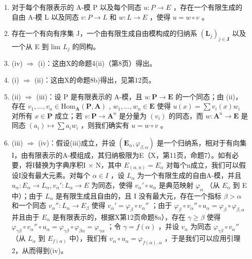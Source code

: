 \begin{enumerate}
\def\labelenumi{(\roman{enumi})}
\setcounter{enumi}{2}
\item
  对于每个有限表示的 A-模 P 以及每个同态 \(u : P \to E\) ，存在一个有限生成的自由 A-模 L 以及同态 \(v : P \to L\) 和 \(w : L \to E\) ，使得 \(u = w \circ v\) 。
\item
  存在一个有向有序集 J，一个由有限生成自由模构成的归纳系 \((\mathbf{L}_{j})_{j\in\mathbf{J}}\) 以及一个从 E 到 lim \(L_{j}\) 的同构。
\item
  (iv) \(\Rightarrow\) (i)：这由X的命题4(ii)（第8页）得出。
\item
  (i) \(\Rightarrow\) (ii)：这由X的命题8b)得出，见第12页。
\item
  (ii) \(\Rightarrow\) (iii)：设 P 是有限表示的 A-模，且 \(u: \mathbf{P} \to \mathbf{E}\) 的一个同态；由 (ii)，存在 \(v_1, \ldots, v_n \in \mathrm{Hom}_{\mathbf{A}}(\mathbf{P}, \mathbf{A})\) , \(w_1, \ldots, w_n \in \mathbf{E}\) 使得 \(u(x) = \sum v_i(x) w_i\) 对所有 \(x \in \mathbf{P}\) 成立；若 \(v: \mathbf{P} \to \mathbf{A}^n\) 是分量为 \((v_i)\) 的同态，而 \(w: \mathbf{A}^n \to \mathbf{E}\) 是同态 \((a_i) \mapsto \sum a_i w_i\) ，则我们确实有 \(u = w \circ v\) 。
\item
  (iii) \(\Rightarrow\) (iv)：假设(iii)成立，并设 \((\mathbf{E}_{\alpha},\varphi_{\beta ,\alpha})\) 是一个归纳系，相对于有向集I，由有限表示的A-模组成，其归纳极限为E（X，第11页，命题7）。如有必要，将I替换为字典序积I × N，其中 \(E_{(\alpha,n)} = E_{\alpha}\) 对每个n成立，我们可以假设I没有最大元素。对每个 \(\alpha \in I\) ，设 \(L_{\alpha}\) 为一个有限生成的自由A-模，并且 \(u_{\alpha}: E_{\alpha} \to L_{\alpha}, v_{\alpha}': L_{\alpha} \to E\) 为同态，使得 \(v_{\alpha}' \circ u_{\alpha}\) 是典范映射 \(\varphi_{\alpha}\) （从 \(E_{\alpha}\) 到 E 中）；由于 \(L_{\alpha}\) 是有限生成且自由的，且 I 没有最大元，存在一个指标 \(\beta > \alpha\) 和一个同态 \(v_{\alpha}'': L_{\alpha} \to E_{\beta}\) 使得 \(v_{\alpha}' = \varphi_{\beta} \circ v_{\alpha}''\) ；由于 \(\varphi_{\beta} \circ v_{\alpha}'' \circ u_{\alpha} = \varphi_{\beta} \circ \varphi_{\beta,\alpha}\) 并且由于 \(E_{\alpha}\) 是有限表示的，根据X第12页命题8a），存在 \(\gamma \geqslant \beta\) 使得 \(\varphi_{\gamma\beta} \circ v_{\alpha}'' \circ u_{\alpha} = \varphi_{\gamma\beta} \circ \varphi_{\beta\alpha} = \varphi_{\gamma\alpha}\) ；令 \(\gamma = f(\alpha)\) ，并设 \(v_{\alpha}\) 为同态 \(\varphi_{\gamma\beta} \circ v_{\alpha}''\) （从 \(L_{\alpha}\) 到 \(E_{f(\alpha)}\) 中），我们有 \(v_{\alpha} \circ u_{\alpha} = \varphi_{f(\alpha),\alpha}\) ，于是我们可以应用引理2，从而得到(iv)。
\end{enumerate}

